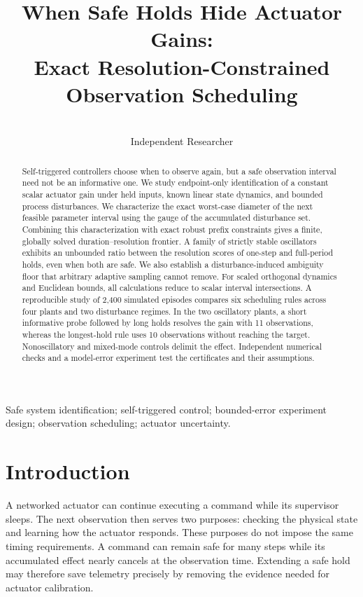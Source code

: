 \documentclass{l4dc2026}
\title[Safe Holds and Actuator Identification]{When Safe Holds Hide Actuator Gains:\\Exact Resolution-Constrained Observation Scheduling}
\author{\Name{Shivam Gupta} \Email{shivam1720406@gmail.com}\\\addr Independent Researcher}
\begin{document}
\raggedbottom
\maketitle
\begin{abstract}
Self-triggered controllers choose when to observe again, but a safe observation interval need not be an informative one. We study endpoint-only identification of a constant scalar actuator gain under held inputs, known linear state dynamics, and bounded process disturbances. We characterize the exact worst-case diameter of the next feasible parameter interval using the gauge of the accumulated disturbance set. Combining this characterization with exact robust prefix constraints gives a finite, globally solved duration--resolution frontier. A family of strictly stable oscillators exhibits an unbounded ratio between the resolution scores of one-step and full-period holds, even when both are safe. We also establish a disturbance-induced ambiguity floor that arbitrary adaptive sampling cannot remove. For scaled orthogonal dynamics and Euclidean bounds, all calculations reduce to scalar interval intersections. A reproducible study of 2,400 simulated episodes compares six scheduling rules across four plants and two disturbance regimes. In the two oscillatory plants, a short informative probe followed by long holds resolves the gain with 11 observations, whereas the longest-hold rule uses 10 observations without reaching the target. Nonoscillatory and mixed-mode controls delimit the effect. Independent numerical checks and a model-error experiment test the certificates and their assumptions.
\end{abstract}
\begin{keywords}
Safe system identification; self-triggered control; bounded-error experiment design; observation scheduling; actuator uncertainty.
\end{keywords}

\section{Introduction}
A networked actuator can continue executing a command while its supervisor sleeps. The next observation then serves two purposes: checking the physical state and learning how the actuator responds. These purposes do not impose the same timing requirements. A command can remain safe for many steps while its accumulated effect nearly cancels at the observation time. Extending a safe hold may therefore save telemetry precisely by removing the evidence needed for actuator calibration.
\end{document}
